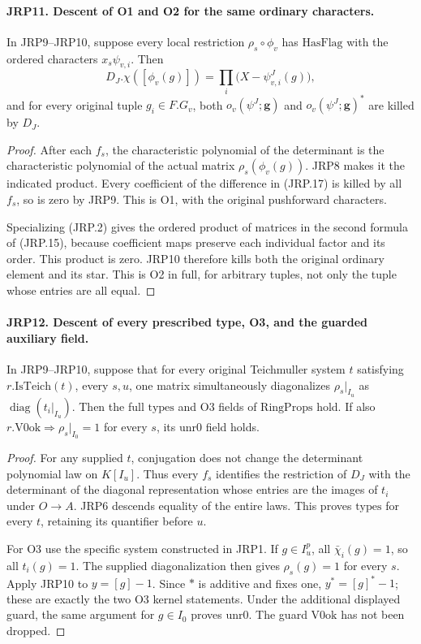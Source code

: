 \paragraph{JRP11. Descent of O1 and O2 for the same ordinary characters.}
\label{claim:JRP11}
In JRP9--JRP10, suppose every local restriction
\(\rho_s\circ\phi_v\) has \(\mathrm{HasFlag}\) with the
ordered characters \(x_s\psi_{v,i}\).  Then
\[
 D_J.\chi([\phi_v(g)])=
                  \prod_i\bigl(X-\psi^J_{v,i}(g)\bigr),
 \tag{JRP.17}
\]
and for every original tuple \(g_i\in F.G_v\), both
\(o_v(\psi^J;\mathbf g)\) and
\(o_v(\psi^J;\mathbf g)^*\) are killed by \(D_J\).
\begin{proof}
After each \(f_s\), the characteristic polynomial of the
determinant is the characteristic polynomial of the actual matrix
\(\rho_s(\phi_v(g))\).  JRP8 makes it the indicated product.
Every coefficient of the difference in (JRP.17) is killed by all
\(f_s\), so is zero by JRP9.  This is O1, with the original
pushforward characters.

Specializing (JRP.2) gives the ordered product of matrices in the
second formula of (JRP.15), because coefficient maps preserve each
individual factor and its order.  This product is zero.  JRP10
therefore kills both the original ordinary element and its star.
This is O2 in full, for arbitrary tuples, not only the tuple whose
entries are all equal.
\end{proof}

\paragraph{JRP12. Descent of every prescribed type, O3, and the guarded auxiliary field.}
\label{claim:JRP12}
In JRP9--JRP10, suppose that for every original Teichmuller
system \(t\) satisfying \(r.\mathrm{IsTeich}(t)\), every
\(s,u\), one matrix simultaneously diagonalizes
\(\rho_s|_{I_u}\) as \(\operatorname{diag}(t_i|_{I_u})\).
Then the full \(\mathrm{types}\) and O3 fields of
\(\mathrm{RingProps}\) hold.  If also
\(r.\mathrm{V0ok}\Rightarrow\rho_s|_{I_0}=1\) for every
\(s\), its \(\mathrm{unr0}\) field holds.
\begin{proof}
For any supplied \(t\), conjugation does not change the
determinant polynomial law on \(K[I_u]\).  Thus every
\(f_s\) identifies the restriction of \(D_J\) with the
determinant of the diagonal representation whose entries are the
images of \(t_i\) under \(O\to A\).  JRP6 descends equality
of the entire laws.  This proves \(\mathrm{types}\) for every
\(t\), retaining its quantifier before \(u\).

For O3 use the specific system constructed in JRP1.  If
\(g\in I^p_u\), all \(\bar\chi_i(g)=1\), so all
\(t_i(g)=1\).  The supplied diagonalization then gives
\(\rho_s(g)=1\) for every \(s\).  Apply JRP10 to
\(y=[g]-1\).  Since \(*\) is additive and fixes one,
\(y^*=[g]^*-1\); these are exactly the two O3 kernel
statements.  Under the additional displayed guard, the same
argument for \(g\in I_0\) proves \(\mathrm{unr0}\).
The guard \(\mathrm{V0ok}\) has not been dropped.
\end{proof}

